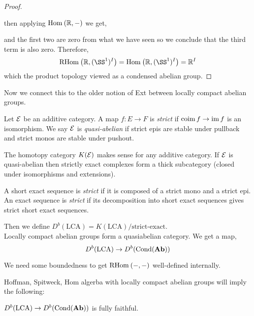 \documentclass[12pt]{article}
\newcommand{\Cond}{\mathrm{Cond}}
\begin{document}
\begin{proof}
\begin{center}
\begin{tikzcd}
\end{tikzcd}
\end{center}
then applying $\Hom{}{\RR}{-}$ we get,
\begin{center}
\end{center}
and the first two are zero from what we have seen so we conclude that the third term is also zero. Therefore,
\[ \RHom{}{\RR}{(\SS^1)^I} = \Hom{}{\RR}{(\SS^1)^I} = \RR^I \]
which the product topology viewed as a condensed abelian group. 
\end{proof}

Now we connect this to the older notion of Ext between locally compact abelian groups.

\begin{defn}
Let $\E$ be an additive category. A map $f : E \to F$ is \textit{strict} if $\coim{f} \to \im{f}$ is an isomorphism. We say $\E$ is \textit{quasi-abelian} if strict epis are stable under pullback and strict monos are stable under pushout. 
\end{defn}

The homotopy category $K(\E)$ makes sense for any additive category. If $\E$ is quasi-abelian then strictly exact complexes form a thick subcategory (closed under isomorphisms and extensions).

\begin{defn}
A short exact sequence is \textit{strict} if it is composed of a strict mono and a strict epi. An exact sequence is \textit{strict} if its decomposition into short exact sequences gives strict short exact sequences.
\end{defn}  

Then we define $D^b(\text{LCA}) = K(\text{LCA}) / \text{strict-exact}$. 
\\
Locally compact abelian groups form a quasiabelian category. We get a map,
\[ D^b(\text{LCA}) \to D^b(\Cond(\Ab)) \]

\begin{rmk}
We need some boundedness to get $\RHom{}{-}{-}$ well-defined internally. 
\end{rmk}

Hoffman, Spitweck, Hom algerba with locally compact abelian groups will imply the following:

\begin{cor}
$D^b(\text{LCA}) \to D^b(\Cond(\Ab))$ is fully faithful.
\end{cor}
\end{document}
